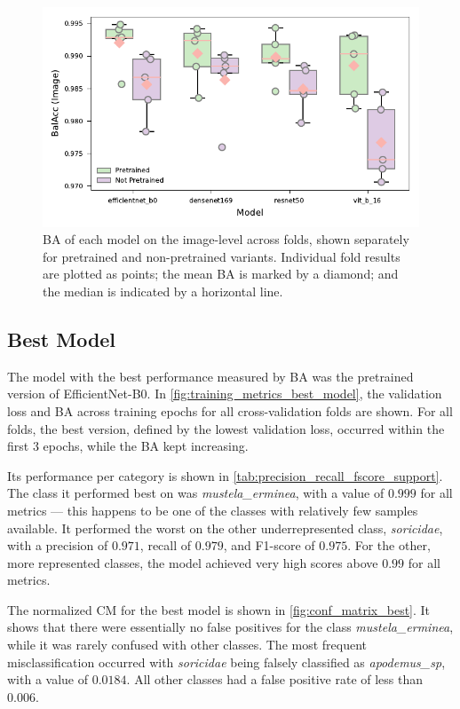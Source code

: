 \begin{figure}[ht]
\centering
\includegraphics{figures/bal_acc_img.pdf}
\caption{\acs{BA} of each model on the image-level across folds, shown separately for pretrained and non-pretrained variants. Individual fold results are plotted as points; the mean \acs{BA} is marked by a diamond; and the median is indicated by a horizontal line.}
\label{fig:bal_acc_img}
\end{figure}

\subsection{Best Model}
The model with the best performance measured by \ac{BA} was the pretrained version of EfficientNet-B0.
In \autoref{fig:training_metrics_best_model}, the validation loss and \ac{BA} across training epochs for all cross-validation folds are shown.
For all folds, the best version, defined by the lowest validation loss, occurred within the first 3 epochs, while the \ac{BA} kept increasing.

Its performance per category is shown in \autoref{tab:precision_recall_fscore_support}.
The class it performed best on was \textit{mustela\_erminea}, with a value of \(0.999\) for all metrics --- this happens to be one of the classes with relatively few samples available.
It performed the worst on the other underrepresented class, \textit{soricidae}, with a precision of \(0.971\), recall of \(0.979\), and F1-score of \(0.975\).
For the other, more represented classes, the model achieved very high scores above \(0.99\) for all metrics.

The normalized \ac{CM} for the best model is shown in \autoref{fig:conf_matrix_best}.
It shows that there were essentially no false positives for the class \textit{mustela\_erminea}, while it was rarely confused with other classes.
The most frequent misclassification occurred with \textit{soricidae} being falsely classified as \textit{apodemus\_sp}, with a value of \(0.0184\).
All other classes had a false positive rate of less than \(0.006\).

